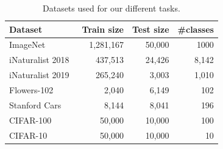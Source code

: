 \begin{table}[t]
\caption{Datasets used for our different tasks.  \label{tab:dataset}}
\smallskip
\centering
{\small
\begin{tabular}{l|rrr}
\toprule
Dataset & Train size & Test size & \#classes   \\
\midrule
ImageNet \cite{Russakovsky2015ImageNet12}  & 1,281,167 & 50,000 & 1000  \\ 
iNaturalist 2018~\cite{Horn2018INaturalist}& 437,513   & 24,426 & 8,142 \\ 
iNaturalist 2019~\cite{Horn2019INaturalist}& 265,240   & 3,003  & 1,010  \\ 
Flowers-102~\cite{Nilsback08}& 2,040 & 6,149 & 102  \\ 
Stanford Cars~\cite{Cars2013}& 8,144 & 8,041 & 196  \\  
CIFAR-100~\cite{Krizhevsky2009LearningML}  & 50,000    & 10,000 & 100   \\ 
CIFAR-10~\cite{Krizhevsky2009LearningML}  & 50,000    & 10,000 & 10   \\ 
\bottomrule
\end{tabular}}
\vspace{-8pt}
\end{table}



